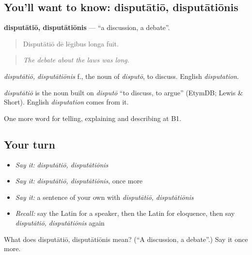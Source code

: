 \subsection*{You'll want to know: disputātiō, disputātiōnis}
\textbf{disputātiō, disputātiōnis} — \textquotedblleft{}a discussion, a debate\textquotedblright{}.

\begin{quote}
Disputātiō dē lēgibus longa fuit.
\end{quote}

\begin{quote}
\emph{The debate about the laws was long.}
\end{quote}

\emph{disputātiō, disputātiōnis} f., the noun of \emph{disputō}, to discuss. English \emph{disputation}.

\begin{cousinweb}
\emph{disputātiō} is the noun built on \emph{disputō} \textquotedblleft{}to discuss, to argue\textquotedblright{} (EtymDB; Lewis \& Short). English \emph{disputation} comes from it.
\end{cousinweb}

\begin{grammarlens}[title={What you've built}]
One more word for telling, explaining and describing at B1.
\end{grammarlens}

\subsection*{Your turn}
\begin{itemize}
\raggedright
  \item \emph{Say it:} \emph{disputātiō, disputātiōnis}
  \item \emph{Say it:} \emph{disputātiō, disputātiōnis}, once more
  \item \emph{Say it:} a sentence of your own with \emph{disputātiō, disputātiōnis}
  \item \emph{Recall:} say the Latin for a speaker, then the Latin for eloquence, then say \emph{disputātiō, disputātiōnis} again
\end{itemize}

\begin{tcolorbox}[breakable,colback=teal!4,colframe=teal!35!black,title={Before you move on}]
What does disputātiō, disputātiōnis mean? (\textquotedblleft{}A discussion, a debate\textquotedblright{}.) Say it once more.
\end{tcolorbox}
